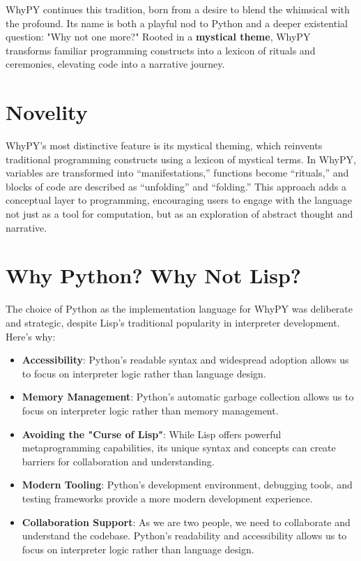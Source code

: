 \documentclass[conference]{IEEEtran}
\begin{document}
WhyPY continues this tradition, born from a desire to blend the whimsical with the profound. Its name is both a playful nod to Python and a deeper existential question: "Why not one more?" Rooted in a \textbf{mystical theme}, WhyPY transforms familiar programming constructs into a lexicon of rituals and ceremonies, elevating code into a narrative journey.



\section{Novelity}
WhyPY’s most distinctive feature is its mystical theming, which reinvents traditional programming constructs using a lexicon of mystical terms. In WhyPY, variables are transformed into “manifestations,” functions become “rituals,” and blocks of code are described as “unfolding” and “folding.” This approach adds a conceptual layer to programming, encouraging users to engage with the language not just as a tool for computation, but as an exploration of abstract thought and narrative.


\section{Why Python? Why Not Lisp?}
The choice of Python as the implementation language for WhyPY was deliberate and strategic, despite Lisp's traditional popularity in interpreter development. Here's why:

\begin{itemize}
    \item \textbf{Accessibility}: Python's readable syntax and widespread adoption allows us to focus on interpreter logic rather than language design.
    
    \item \textbf{Memory Management}: Python's automatic garbage collection allows us to focus on interpreter logic rather than memory management.
    
    \item \textbf{Avoiding the "Curse of Lisp"}: While Lisp offers powerful metaprogramming capabilities, its unique syntax and concepts can create barriers for collaboration and understanding.
    
    \item \textbf{Modern Tooling}: Python's development environment, debugging tools, and testing frameworks provide a more modern development experience.
    
    \item \textbf{Collaboration Support}: As we are two people, we need to collaborate and understand the codebase. Python's readability and accessibility allows us to focus on interpreter logic rather than language design.
\end{itemize}
\end{document}
